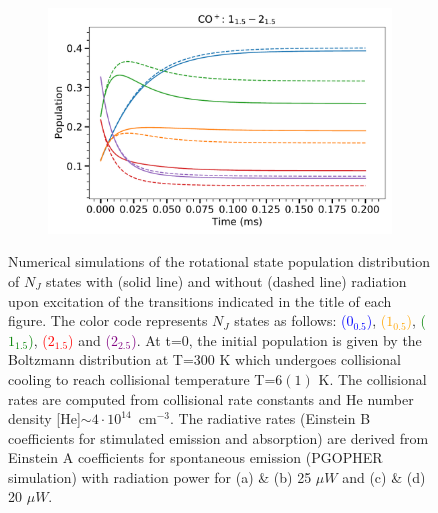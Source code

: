 \begin{figure}[!htb]
\begin{subfigure}[b]{0.49\textwidth}
        \caption{}
    \end{subfigure}
    \hfill
    \begin{subfigure}[b]{0.49\textwidth}
        \centering
        \includegraphics[width=1\textwidth]{chapters/CO+_ROSAA_paper/SI/CO^+_pop_ratio_1_1.5 - 2_1.5.pdf}
        \caption{}
    \end{subfigure}
    \caption{Numerical simulations of the rotational state population distribution of $N_J$ states with (solid line) and without (dashed line) radiation upon excitation of the transitions indicated in the title of each figure. The color code represents $N_J$ states as follows: \textcolor{blue}{\co($0_{0.5}$)}, \textcolor{orange}{\co($1_{0.5}$)}, \textcolor{green}{\co($1_{1.5}$)}, \textcolor{red}{\co($2_{1.5}$)} and  \textcolor{purple}{\co($2_{2.5}$)}. At t=0, the initial population is given by the  Boltzmann distribution at T=300 K which undergoes collisional cooling to reach collisional temperature T=$6(1)$ K. The collisional rates are computed from collisional rate constants and He number density [He]$\sim 4\cdot10^{14}$~cm$^{-3}$. The radiative rates (Einstein B  coefficients for stimulated emission and absorption) are derived from Einstein A coefficients for spontaneous emission (PGOPHER simulation) with radiation power for (a) \& (b) 25 $\mu W$ and (c) \& (d) 20 $\mu W$.}
\end{figure}

